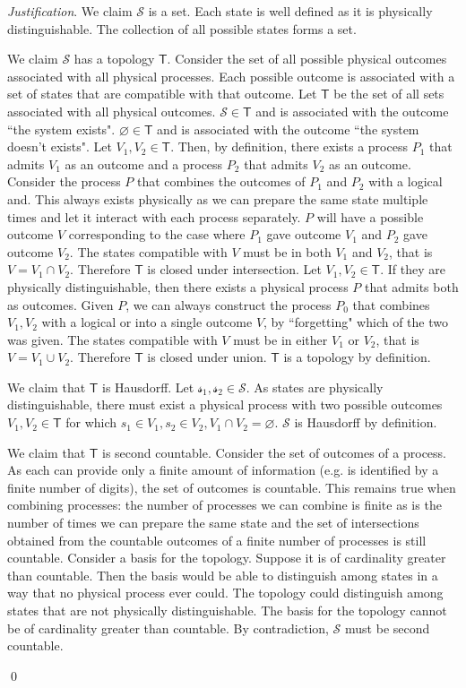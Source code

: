 \documentclass[aps,pra,10pt,twocolumn,floatfix,nofootinbib]{revtex4-1}
\numberwithin{equation}{section}
\theoremstyle{definition}
\newenvironment{justification}{\emph{Justification}.}{\qed}
\begin{document}
\begin{justification}
We claim $\mathcal{S}$ is a set. Each state is well defined as it is physically distinguishable. The collection of all possible states forms a set.

We claim $\mathcal{S}$ has a topology $\mathsf{T}$. Consider the set of all possible physical outcomes associated with all physical processes. Each possible outcome is associated with a set of states that are compatible with that outcome. Let $\mathsf{T}$ be the set of all sets associated with all physical outcomes. $\mathcal{S} \in \mathsf{T}$ and is associated with the outcome ``the system exists". $\varnothing \in \mathsf{T}$ and is associated with the outcome ``the system doesn't exists". Let $V_1, V_2 \in \mathsf{T}$. Then, by definition, there exists a process $P_1$ that admits $V_1$ as an outcome and a process $P_2$ that admits $V_2$ as an outcome. Consider the process $P$ that combines the outcomes of $P_1$ and $P_2$ with a logical and. This always exists physically as we can prepare the same state multiple times and let it interact with each process separately. $P$ will have a possible outcome $V$ corresponding to the case where $P_1$ gave outcome $V_1$ and $P_2$ gave outcome $V_2$. The states compatible with $V$ must be in both $V_1$ and $V_2$, that is $V = V_1 \cap V_2$. Therefore $\mathsf{T}$ is closed under intersection. Let $V_1, V_2 \in \mathsf{T}$. If they are physically distinguishable, then there exists a physical process $P$ that admits both as outcomes. Given $P$, we can always construct the process $P_0$ that combines $V_1, V_2$ with a logical or into a single outcome $V$, by ``forgetting" which of the two was given. The states compatible with $V$ must be in either $V_1$ or $V_2$, that is $V = V_1 \cup V_2$. Therefore $\mathsf{T}$ is closed under union. $\mathsf{T}$ is a topology by definition.

We claim that $\mathsf{T}$ is Hausdorff. Let $\mathcal{s_1}, \mathcal{s_2} \in \mathcal{S}$. As states are physically distinguishable, there must exist a physical process with two possible outcomes $V_1, V_2 \in \mathsf{T}$ for which $s_1 \in V_1, s_2 \in V_2, V_1 \cap V_2 = \varnothing$. $\mathcal{S}$ is Hausdorff by definition.

We claim that $\mathsf{T}$ is second countable. Consider the set of outcomes of a process. As each can provide only a finite amount of information (e.g. is identified by a finite number of digits), the set of outcomes is countable. This remains true when combining processes: the number of processes we can combine is finite as is the number of times we can prepare the same state and the set of intersections obtained from the countable outcomes of a finite number of processes is still countable. Consider a basis for the topology. Suppose it is of cardinality greater than countable. Then the basis would be able to distinguish among states in a way that no physical process ever could. The topology could distinguish among states that are not physically distinguishable. The basis for the topology cannot be of cardinality greater than countable. By contradiction, $\mathcal{S}$ must be second countable.

\end{justification}
\end{document}
